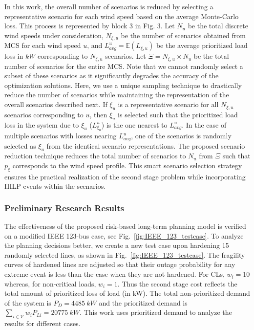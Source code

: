 In this work, the overall number of scenarios is reduced by selecting a representative scenario for each wind speed based on the average Monte-Carlo loss. This process is represented by block 3 in Fig. 3. Let $N_u$ be the total discrete wind speeds under consideration, $N_{\xi,u}$ be the number of scenarios obtained from MCS for each wind speed $u$, and $L^{u}_{avg} = \mathbb{E}(L_{\xi,u})$ be the average prioritized load loss in $kW$ corresponding to $N_{\xi,u}$ scenarios. Let $\Xi = N_{\xi,u} \times N_u$ be the total number of scenarios for the entire MCS. Note that we cannot randomly select a subset of these scenarios as it significantly degrades the accuracy of the optimization solutions. Here, we use a unique sampling technique to drastically reduce the number of scenarios while maintaining the representation of the overall scenarios described next. If $\xi_u$ is a representative scenario for all $N_{\xi,u}$ scenarios corresponding to $u$, then $\xi_u$ is selected such that the prioritized load loss in the system due to $\xi_u$ ($L^{u}_{\xi_u}$) is the one nearest to $L^{u}_{avg}$. In the case of multiple scenarios with losses nearing $L^{u}_{avg}$, one of the scenarios is randomly selected as $\xi_u$ from the identical scenario representations. The proposed scenario reduction technique reduces the total number of scenarios to $N_u$ from $\Xi$ such that $p_\xi$ corresponds to the wind speed profile. This smart scenario selection strategy ensures the practical realization of the second stage problem while incorporating HILP events within the scenarios. 

\subsubsection{Preliminary Research Results}
The effectiveness of the proposed risk-based long-term planning model is verified on a modified IEEE 123-bus case, see Fig.~\ref{fig:IEEE_123_testcase}. To analyze the planning decisions better, we create a new test case upon hardening 15 randomly selected lines, as shown in Fig.~\ref{fig:IEEE_123_testcase}. The fragility curves of hardened lines are adjusted so that their outage probability for any extreme event is less than the case when they are not hardened. For CLs, $w_i = 10$ whereas, for non-critical loads, $w_i = 1$. Thus the second stage cost reflects the total amount of prioritized loss of load (in kW). The total non-prioritized demand of the system is $P_D = 4485~kW$ and the prioritized demand is $\sum_{i\in\mathcal{V}}{w_iP_{Li}} = 20775~kW$. This work uses prioritized demand to analyze the results for different cases.

